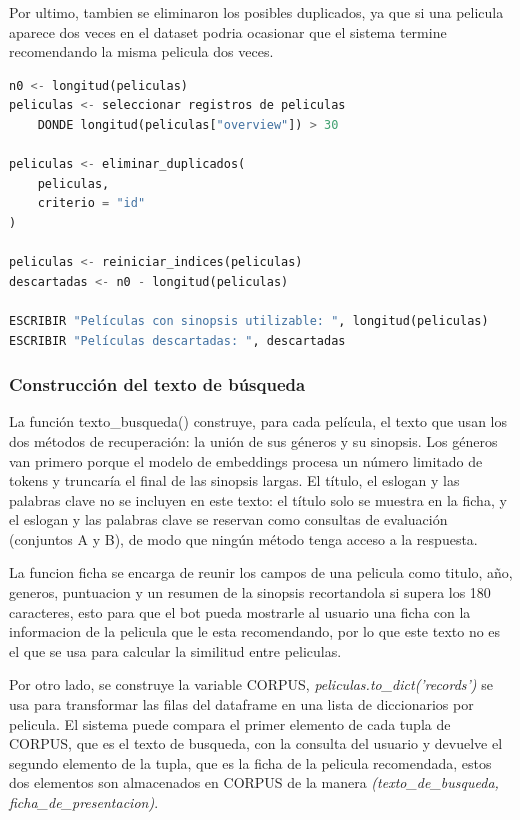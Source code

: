 Por ultimo, tambien se eliminaron los posibles duplicados, ya que si una pelicula aparece dos veces en el dataset podria ocasionar que el sistema termine recomendando la misma pelicula dos veces.

\begin{lstlisting}[language=Python, caption={~}]
n0 <- longitud(peliculas)
peliculas <- seleccionar registros de peliculas 
    DONDE longitud(peliculas["overview"]) > 30

peliculas <- eliminar_duplicados(
    peliculas,
    criterio = "id"
)

peliculas <- reiniciar_indices(peliculas)
descartadas <- n0 - longitud(peliculas)

ESCRIBIR "Películas con sinopsis utilizable: ", longitud(peliculas)
ESCRIBIR "Películas descartadas: ", descartadas
\end{lstlisting}

\subsubsection{Construcción del texto de búsqueda}

La función texto_busqueda() construye, para cada película, el texto que usan los dos métodos de recuperación: la unión de sus géneros y su sinopsis. Los géneros van primero porque el modelo de embeddings procesa un número limitado de tokens y truncaría el final de las sinopsis largas. El título, el eslogan y las palabras clave no se incluyen en este texto: el título solo se muestra en la ficha, y el eslogan y las palabras clave se reservan como consultas de evaluación (conjuntos A y B), de modo que ningún método tenga acceso a la respuesta.

La funcion ficha se encarga de reunir los campos de una pelicula como titulo, año, generos, puntuacion y un resumen de la sinopsis recortandola si supera los 180 caracteres, esto para que el bot pueda mostrarle al usuario una ficha con la informacion de la pelicula que le esta recomendando, por lo que este texto no es el que se usa para calcular la similitud entre peliculas.

Por otro lado, se construye la variable CORPUS, \textit{peliculas.to\_dict('records')} se usa para transformar las filas del dataframe en una lista de diccionarios por pelicula. El sistema puede compara el primer elemento de cada tupla de CORPUS, que es el texto de busqueda, con la consulta del usuario y devuelve el segundo elemento de la tupla, que es la ficha de la pelicula recomendada, estos dos elementos son almacenados en CORPUS de la manera \textit{(texto\_de\_busqueda, ficha\_de\_presentacion)}.  

